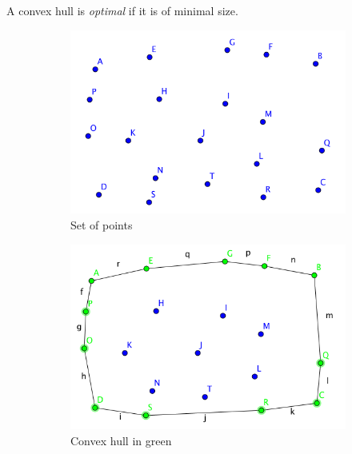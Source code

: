 \begin{definition}
A convex hull is \emph{optimal} if it is of minimal size.
\end{definition}

\begin{figure}[!htb]
\centering
\begin{subfigure}[b]{.33\linewidth}
\includegraphics[width=\linewidth]{set_of_points}
\caption{Set of points}\label{fig:points}
\end{subfigure}\hspace{20 mm}
\begin{subfigure}[b]{.33\linewidth}
\includegraphics[width=\linewidth]{convex_hull_of_set}
\caption{Convex hull in green}\label{fig:convex_hull}
\end{subfigure}\hspace{20 mm}
\begin{subfigure}[b]{.33\linewidth}

\end{subfigure}
\end{figure}
